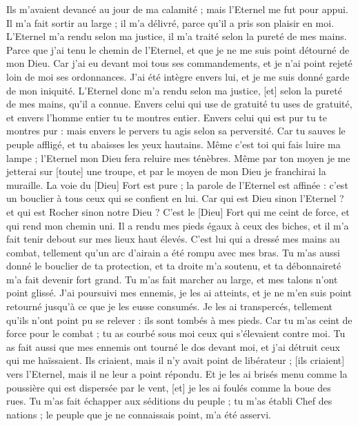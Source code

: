 \begin{multicols}{2}
Ils m'avaient devancé au jour de ma calamité ; mais l'Eternel me fut pour appui.
Il m'a fait sortir au large ; il m'a délivré, parce qu'il a pris son plaisir en moi.
L'Eternel m'a rendu selon ma justice, il m'a traité selon la pureté de mes mains.
Parce que j'ai tenu le chemin de l'Eternel, et que je ne me suis point détourné de mon Dieu.
Car j'ai eu devant moi tous ses commandements, et je n'ai point rejeté loin de moi ses ordonnances.
J'ai été intègre envers lui, et je me suis donné garde de mon iniquité.
L'Eternel donc m'a rendu selon ma justice, [et] selon la pureté de mes mains, qu'il a connue.
Envers celui qui use de gratuité tu uses de gratuité, et envers l'homme entier tu te montres entier.
Envers celui qui est pur tu te montres pur : mais envers le pervers tu agis selon sa perversité.
Car tu sauves le peuple affligé, et tu abaisses les yeux hautains.
Même c'est toi qui fais luire ma lampe ; l'Eternel mon Dieu fera reluire mes ténèbres.
Même par ton moyen je me jetterai sur [toute] une troupe, et par le moyen de mon Dieu je franchirai la muraille.
La voie du [Dieu] Fort est pure ; la parole de l'Eternel est affinée : c'est un bouclier à tous ceux qui se confient en lui.
Car qui est Dieu sinon l'Eternel ? et qui est Rocher sinon notre Dieu ?
C'est le [Dieu] Fort qui me ceint de force, et qui rend mon chemin uni.
Il a rendu mes pieds égaux à ceux des biches, et il m'a fait tenir debout sur mes lieux haut élevés.
C'est lui qui a dressé mes mains au combat, tellement qu'un arc d'airain a été rompu avec mes bras.
Tu m'as aussi donné le bouclier de ta protection, et ta droite m'a soutenu, et ta débonnaireté m'a fait devenir fort grand.
Tu m'as fait marcher au large, et mes talons n'ont point glissé.
J'ai poursuivi mes ennemis, je les ai atteints, et je ne m'en suis point retourné jusqu'à ce que je les eusse consumés.
Je les ai transpercés, tellement qu'ils n'ont point pu se relever : ils sont tombés à mes pieds.
Car tu m'as ceint de force pour le combat ; tu as courbé sous moi ceux qui s'élevaient contre moi.
Tu as fait aussi que mes ennemis ont tourné le dos devant moi, et j'ai détruit ceux qui me haïssaient.
Ils criaient, mais il n'y avait point de libérateur ; [ils criaient] vers l'Eternel, mais il ne leur a point répondu.
Et je les ai brisés menu comme la poussière qui est dispersée par le vent, [et] je les ai foulés comme la boue des rues.
Tu m'as fait échapper aux séditions du peuple ; tu m'as établi Chef des nations ; le peuple que je ne connaissais point, m'a été asservi.

\end{multicols}
